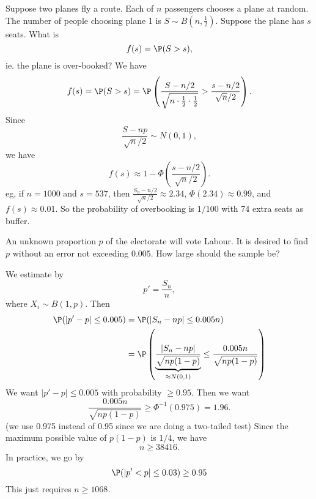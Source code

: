 \documentclass[a4paper]{article}
\begin{document}
\begin{eg}
  Suppose two planes fly a route. Each of $n$ passengers chooses a plane at random. The number of people choosing plane 1 is $S\sim B(n, \frac{1}{2})$. Suppose the plane has $s$ seats. What is
  \[
    f(s) = \P(S > s),
  \]
  ie. the plane is over-booked? We have
  \[
    f(s) = \P(S > s) = \P\left(\frac{S - n/2}{\sqrt{n\cdot \frac{1}{2}\cdot \frac{1}{2}}} > \frac{s - n/2}{\sqrt{n}/2}\right).
  \]
  Since
  \[
    \frac{S - np}{\sqrt{n}/2}\sim N(0, 1),
  \]
  we have
  \[
    f(s) \approx 1 - \Phi\left(\frac{s - n/2}{\sqrt{n}/2}\right).
  \]
  eg, if $n = 1000$ and $s = 537$, then $\frac{S_n - n/2}{\sqrt{n}/2}\approx 2.34$, $\Phi(2.34)\approx 0.99$, and $f(s) \approx 0.01$. So the probability of overbooking is $1/100$ with 74 extra seats as buffer.
\end{eg}

\begin{eg}
  An unknown proportion $p$ of the electorate will vote Labour. It is desired to find $p$ without an error not exceeding $0.005$. How large should the sample be?

  We estimate by
  \[
    p' = \frac{S_n}{n},
  \]
  where $X_i\sim B(1, p)$. Then
  \begin{align*}
    \P(|p' - p| \leq 0.005) &= \P(|S_n - np| \leq 0.005n)\\
    &= \P\left(\underbrace{\frac{|S_n - np|}{\sqrt{np(1 - p)}}}_{\approx N(0, 1)} \leq \frac{0.005n}{\sqrt{np(1 - p)}}\right)
  \end{align*}
  We want $|p' - p| \leq 0.005$ with probability $\geq 0.95$. Then we want
  \[
    \frac{0.005n}{\sqrt{np(1 - p)}} \geq \Phi^{-1}(0.975) = 1.96.
  \]
  (we use 0.975 instead of 0.95 since we are doing a two-tailed test) Since the maximum possible value of $p(1 - p)$ is $1/4$, we have
  \[
    n \geq 38416.
  \]
  In practice, we go by
  \[
    \P(|p' < p| \leq 0.03) \geq 0.95
  \]
  This just requires $n \geq 1068$.
\end{eg}
\end{document}
